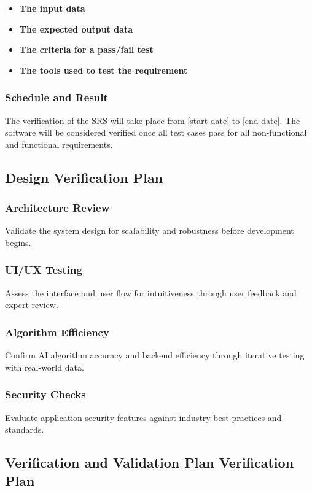 \documentclass[12pt, titlepage]{article}
\begin{document}
    \begin{itemize}
        \item \textbf{The input data}
        \item \textbf{The expected output data}
        \item \textbf{The criteria for a pass/fail test}
        \item \textbf{The tools used to test the requirement}
    \end{itemize}

    \subsubsection{Schedule and Result}
    The verification of the SRS will take place from [start date] to [end date]. The software will be considered verified once all test cases pass for all non-functional and functional requirements.

    \subsection{Design Verification Plan}

    \subsubsection{Architecture Review}
    Validate the system design for scalability and robustness before development begins.

    \subsubsection{UI/UX Testing}
    Assess the interface and user flow for intuitiveness through user feedback and expert review.

    \subsubsection{Algorithm Efficiency}
    Confirm AI algorithm accuracy and backend efficiency through iterative testing with real-world data.

    \subsubsection{Security Checks}
    Evaluate application security features against industry best practices and standards.

    \subsection{Verification and Validation Plan Verification Plan}
\end{document}
